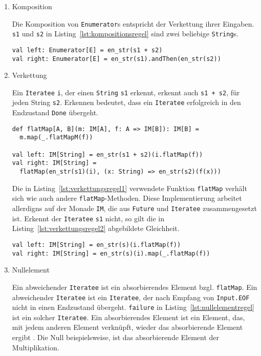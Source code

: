 \begin{enumerate}
  \item Komposition

    Die Komposition von \lstinline|Enumerator|s entspricht der Verkettung ihrer Eingaben.
    \lstinline|s1| und \lstinline|s2| in Listing~\ref{lst:kompositionsregel} sind zwei beliebige \lstinline|String|s.

    \begin{lstlisting}[caption=Kompositionsregel, label=lst:kompositionsregel]
val left: Enumerator[E] = en_str(s1 + s2)
val right: Enumerator[E] = en_str(s1).andThen(en_str(s2))
\end{lstlisting}

  \item Verkettung

    Ein \lstinline|Iteratee| \lstinline|i|, der einen \lstinline|String| \lstinline|s1| erkennt, erkennt auch \lstinline|s1 + s2|, für jeden String \lstinline|s2|.
    Erkennen bedeutet, dass ein \lstinline|Iteratee| erfolgreich in den Endzustand \lstinline|Done| übergeht.

    \begin{lstlisting}[caption={Verkettungsregel, wenn ein Iteratee die Eingabe erkennt}, label=lst:verkettungsregel1]
def flatMap[A, B](m: IM[A], f: A => IM[B]): IM[B] =
  m.map(_.flatMapM(f))

val left: IM[String] = en_str(s1 + s2)(i.flatMap(f))
val right: IM[String] =
  flatMap(en_str(s1)(i), (x: String) => en_str(s2)(f(x)))
\end{lstlisting}

    Die in Listing~\ref{lst:verkettungsregel1} verwendete Funktion \lstinline|flatMap| verhält sich wie auch andere \lstinline|flatMap|-Methoden.
    Diese Implementierung arbeitet allerdigns auf der Monade \lstinline|IM|, die aus \lstinline|Future| und \lstinline|Iteratee| zusammengesetzt ist.
    Erkennt der \lstinline|Iteratee| \lstinline|s1| nicht, so gilt die in Listing~\ref{lst:verkettungsregel2} abgebildete Gleichheit.

    \begin{lstlisting}[caption={Verkettungsregel, wenn ein Iteratee die Eingabe nicht erkennt}, label=lst:verkettungsregel2]
val left: IM[String] = en_str(s)(i.flatMap(f))
val right: IM[String] = en_str(s)(i).map(_.flatMap(f))
\end{lstlisting}

  \item Nullelement

    Ein abweichender \lstinline|Iteratee| ist ein absorbierendes Element bzgl. \lstinline|flatMap|.
    Ein abweichender \lstinline|Iteratee| ist ein \lstinline|Iteratee|, der nach Empfang von \lstinline|Input.EOF| nicht in einen Endzustand übergeht.
    \lstinline|failure| in Listing~\ref{lst:nullelementregel} ist ein solcher \lstinline|Iteratee|.
    Ein absorbierendes Element ist ein Element, das, mit jedem anderen Element verknüpft, wieder das absorbierende Element ergibt \cite[vgl.][S.~15]{absorbing_element}.
    Die Null beispielsweise, ist das absorbierende Element der Multiplikation.


\end{enumerate}
